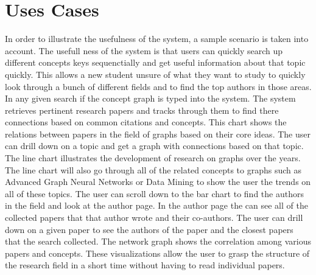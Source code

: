 \documentclass[sigconf]{acmart}
\begin{document}
\section{Uses Cases}
In order to illustrate the usefulness of the system, a sample scenario is taken into account. The usefull ness of the system is that users can quickly search up different concepts keys sequenctially and get useful information about that topic quickly. This allows a new student unsure of what they want to study to quickly look through a bunch of different fields and to find the top authors in those areas. In any given search if the concept graph is typed into the system. The system retrieves pertinent research papers and tracks through them to find there connections based on common citations and concepts. This chart shows the relations between papers in the field of graphs based on their core ideas. The user can drill down on a topic and get a graph with connections based on that topic.  The line chart illustrates the development of research on graphs over the years. The line chart will also go through all of the related concepts to graphs such as Advanced Graph Neural Networks or Data Mining to show the user the trends on all of these topics. The user can scroll down to the bar chart to find the authors in the field and look at the author page. In the author page the can see all of the collected papers that that author wrote and their co-authors. The user can drill down on a given paper to see the authors of the paper and the closest papers that the search collected.  The network graph shows the correlation among various papers and concepts. These visualizations allow the user to grasp the structure of the research field in a short time without having to read individual papers.
\end{document}
